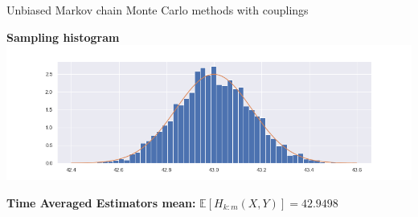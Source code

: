 \documentclass{beamer}
\begin{document}
\begin{section}{Unbiased Markov chain Monte Carlo methods with couplings}
\begin{frame}
		\vspace{0.2cm}
	
		\begin{minipage}{0.48\textwidth}
			\begin{center}
				{\scriptsize \textbf{Sampling histogram}}
				\includegraphics[width=\textwidth]{img/mcmc_coupling_histogram}
			\end{center}
		\end{minipage}
		\hfill
		\begin{minipage}{0.48\textwidth}
			\begin{center}
				{\small\textbf{Time Averaged Estimators mean:}}
				$ \mathbb{E}[H_{k:m}(X,Y)] = 42.9498$
			\end{center}
		\end{minipage}
		
	\end{frame}
	
\end{section}
\end{document}
